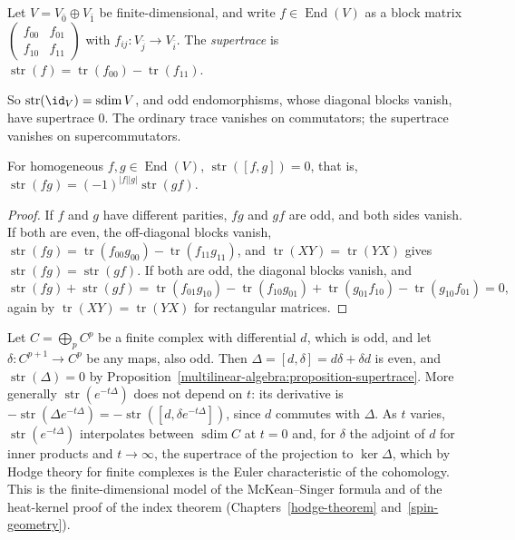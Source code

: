 \begin{definition}\label{multilinear-algebra:definition-supertrace}
Let $V = V_{\bar 0} \oplus V_{\bar 1}$ be finite-dimensional, and write $f \in \operatorname{End}(V)$ as a block matrix $\begin{pmatrix} f_{00} & f_{01} \\ f_{10} & f_{11}\end{pmatrix}$ with $f_{ij} \colon V_{\bar j} \to V_{\bar i}$. The
\emph{supertrace} is $\operatorname{str}(f) = \operatorname{tr}(f_{00}) - \operatorname{tr}(f_{11})$.
\end{definition}

So $\operatorname{str}(\id_V) = \operatorname{sdim}V$, and odd endomorphisms, whose diagonal blocks vanish, have supertrace $0$. The ordinary trace vanishes on commutators; the supertrace vanishes on supercommutators.

\begin{proposition}\label{multilinear-algebra:proposition-supertrace}
For homogeneous $f, g \in \operatorname{End}(V)$, $\operatorname{str}([f, g]) = 0$, that is, $\operatorname{str}(fg) = (-1)^{|f||g|}\operatorname{str}(gf)$.
\end{proposition}

\begin{proof}
If $f$ and $g$ have different parities, $fg$ and $gf$ are odd, and both sides vanish. If both are even, the off-diagonal blocks vanish, $\operatorname{str}(fg) = \operatorname{tr}(f_{00}g_{00}) - \operatorname{tr}(f_{11}g_{11})$, and
$\operatorname{tr}(XY) = \operatorname{tr}(YX)$ gives $\operatorname{str}(fg) = \operatorname{str}(gf)$. If both are odd, the diagonal blocks vanish, and
\[
\operatorname{str}(fg) + \operatorname{str}(gf) = \operatorname{tr}(f_{01}g_{10}) - \operatorname{tr}(f_{10}g_{01}) + \operatorname{tr}(g_{01}f_{10}) - \operatorname{tr}(g_{10}f_{01}) = 0,
\]
again by $\operatorname{tr}(XY) = \operatorname{tr}(YX)$ for rectangular matrices.
\end{proof}

\begin{example}\label{multilinear-algebra:example-supertrace-complex}
Let $C = \bigoplus_pC^p$ be a finite complex with differential $d$, which is odd, and let $\delta \colon C^{p+1} \to C^p$ be any maps, also odd. Then $\Delta = [d, \delta] = d\delta + \delta d$ is even, and
$\operatorname{str}(\Delta) = 0$ by Proposition~\ref{multilinear-algebra:proposition-supertrace}. More generally $\operatorname{str}(e^{-t\Delta})$ does not depend on $t$: its derivative is $-\operatorname{str}(\Delta e^{-t\Delta}) = -\operatorname{str}([d, \delta e^{-t\Delta}])$,
since $d$ commutes with $\Delta$. As $t$ varies, $\operatorname{str}(e^{-t\Delta})$ interpolates between $\operatorname{sdim}C$ at $t = 0$ and, for $\delta$ the adjoint of $d$ for inner products and $t \to \infty$, the supertrace of
the projection to $\ker\Delta$, which by Hodge theory for finite complexes is the Euler characteristic of the cohomology. This is the finite-dimensional model of the McKean--Singer formula and of the
heat-kernel proof of the index theorem (Chapters~\ref{hodge-theorem} and~\ref{spin-geometry}).
\end{example}

